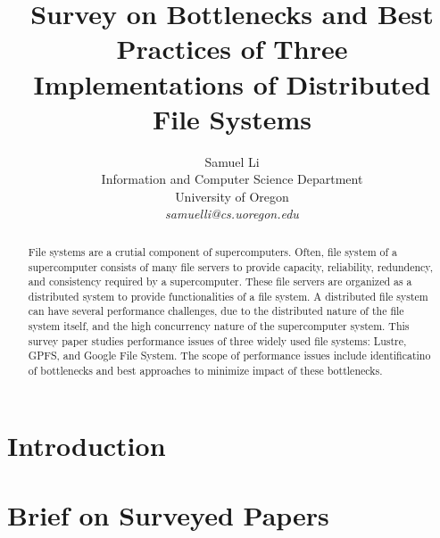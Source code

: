 \documentclass[12pt,twocolumn]{IEEEtran11}
\begin{document}


\title{\Large \bf 
Survey on Bottlenecks and Best Practices of Three Implementations of
Distributed File Systems
}
\author{
Samuel Li\\
Information and Computer Science Department\\
University of Oregon\\
{\em samuelli@cs.uoregon.edu}
}
\maketitle
\begin{abstract}
File systems are a crutial component of supercomputers.
%
Often, file system of a supercomputer consists of many file servers
to provide capacity, reliability, redundency, and consistency
required by a supercomputer.
%
These file servers are organized as a distributed system
to provide functionalities of a file system.
%
A distributed file system can have several performance challenges,
due to the distributed nature of the file system itself,
and the high concurrency nature of the supercomputer system.
%
This survey paper studies performance issues of three widely 
used file systems: Lustre, GPFS, and Google File System.
%
The scope of performance issues include identificatino of bottlenecks
and best approaches to minimize impact of these bottlenecks.
\end{abstract}


\section{Introduction}
\label{sec:intro}


\section{Brief on Surveyed Papers}
\label{sec:brief}



\end{document}
